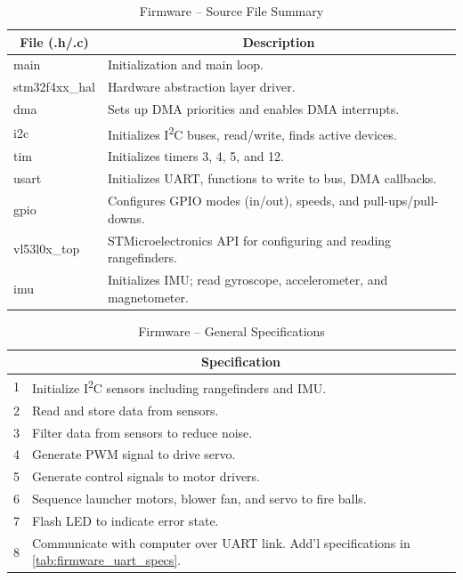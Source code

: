 \begin{table}[H]
	\centering	\caption{Firmware -- Source File Summary} 
	\begin{tabular}{ll}
		\hline 
		\multicolumn{1}{c}{File (.h/.c)} & \multicolumn{1}{c}{Description} \\ \hline 
		main & Initialization and main loop. \\ \hline 
		stm32f4xx\_hal & Hardware abstraction layer driver. \\ \hline 			
		dma & Sets up DMA priorities and enables DMA interrupts. \\ \hline 		
		i2c & Initializes I\textsuperscript{2}C buses, read/write, finds active devices. \\ \hline 		
		tim & Initializes timers 3, 4, 5, and 12. \\ \hline 		
		usart & Initializes UART, functions to write to bus, DMA callbacks. \\ \hline 		
		gpio & Configures GPIO modes (in/out), speeds, and pull-ups/pull-downs. \\ \hline 		
		vl53l0x\_top & STMicroelectronics API for configuring and reading rangefinders. \\ \hline 				 
		imu & Initializes IMU; read gyroscope, accelerometer, and magnetometer. \\ \hline 		
	\end{tabular} 
	\label{tab:firmware_file_desc}
\end{table}

\begin{table}[H]
	\centering	\caption{Firmware -- General Specifications} 
	\begin{tabular}{cl}
		\hline 
		 & \multicolumn{1}{c}{Specification} \\ \hline 
		1 & Initialize I\textsuperscript{2}C sensors including rangefinders and IMU. \\ \hline 
		2 & Read and store data from sensors. \\ \hline 
		3 & Filter data from sensors to reduce noise. \\ \hline 
		4 & Generate PWM signal to drive servo. \\ \hline 
		5 & Generate control signals to motor drivers. \\ \hline 
		6 & Sequence launcher motors, blower fan, and servo to fire balls. \\ \hline 
		7 & Flash LED to indicate error state. \\ \hline 
		8 & Communicate with computer over UART link. Add'l specifications in \ref{tab:firmware_uart_specs}. \\ \hline 
	\end{tabular} 
	\label{tab:firmware_specs}
\end{table}

